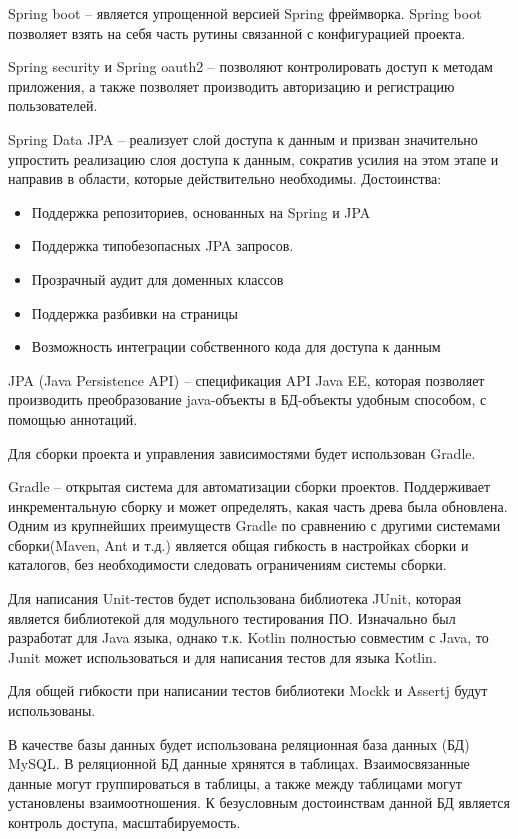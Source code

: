 Spring boot – является упрощенной версией Spring фреймворка.
Spring boot позволяет взять на себя часть рутины связанной с конфигурацией проекта.

Spring security и Spring oauth2 – позволяют контролировать доступ к методам приложения, а также позволяет производить авторизацию и регистрацию пользователей.

Spring Data JPA – реализует слой доступа к данным и призван значительно упростить реализацию слоя доступа к данным, сократив усилия на этом этапе и направив в области, которые действительно необходимы.
Достоинства:
\begin{itemize}
    \item Поддержка репозиториев, основанных на Spring и JPA
    \item Поддержка типобезопасных JPA запросов.
    \item Прозрачный аудит для доменных классов
    \item Поддержка разбивки на страницы
    \item Возможность интеграции собственного кода для доступа к данным
\end{itemize}

JPA (Java Persistence API) – спецификация API Java EE, которая позволяет производить преобразование java-объекты в БД-объекты удобным способом, с помощью аннотаций.

Для сборки проекта и управления зависимостями будет использован Gradle.

Gradle – открытая система для автоматизации сборки проектов.
Поддерживает инкрементальную сборку и может определять, какая часть древа была обновлена.
Одним из крупнейших преимуществ Gradle по сравнению с другими системами сборки(Maven, Ant и т.д.) является общая гибкость в настройках сборки и каталогов, без необходимости следовать ограничениям системы сборки.

Для написания Unit-тестов будет использована библиотека JUnit, которая является библиотекой для модульного тестирования ПО.
Изначально был разработат для Java языка, однако т.к. Kotlin полностью совместим с Java, то Junit может использоваться и для написания тестов для языка Kotlin.

Для общей гибкости при написании тестов библиотеки Mockk и Assertj будут использованы.

В качестве базы данных будет использована реляционная база данных (БД) MySQL. В реляционной БД данные хрянятся в таблицах.
Взаимосвязанные данные могут группироваться в таблицы, а также между таблицами могут установлены взаимоотношения.
К безусловным достоинствам данной БД является контроль доступа, масштабируемость.

